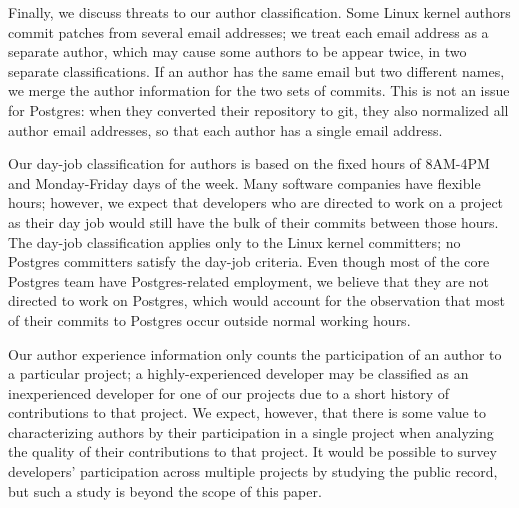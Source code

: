 Finally, we discuss threats to our author classification. Some Linux kernel 
authors commit patches from several email addresses; we treat each
email address as a separate author, which may cause some authors to be
appear twice, in two separate classifications. If an author has the
same email but two different names, we merge the author information
for the two sets of commits. This is not an issue for Postgres: when
they converted their repository to git, they also normalized all author
email addresses, so that each author has a single email address.

Our day-job classification for authors is based on the fixed hours of
8AM-4PM and Monday-Friday days of the week.  Many software companies
have flexible hours; however, we expect that developers who are
directed to work on a project as their day job would still have the
bulk of their commits between those hours.  The day-job classification
applies only to the Linux kernel committers; no Postgres committers satisfy
the day-job criteria. Even though most of the core Postgres team have
Postgres-related employment, we believe that they are not directed to
work on Postgres, which would account for the observation that most of
their commits to Postgres occur outside normal working hours.

Our author experience information only counts the participation of an
author to a particular project; a highly-experienced developer may be
classified as an inexperienced developer for one of our projects due
to a short history of contributions to that project. We expect,
however, that there is some value to characterizing authors by their
participation in a single project when analyzing the quality of their
contributions to that project. It would be possible to survey
developers' participation across multiple projects by studying the
public record, but such a study is beyond the scope of this paper.
